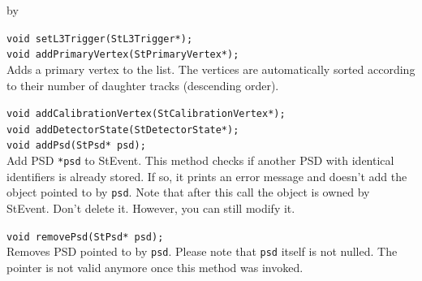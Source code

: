 \documentclass[twoside]{article}
\newcommand{\entrylabel}[1]{\mbox{\textbf{{#1}}}\hfil}%
\newenvironment{entry}
{\begin{list}{}%
    {\renewcommand{\makelabel}{\entrylabel}%
     \setlength{\labelwidth}{90pt}%
     \setlength{\leftmargin}{\labelwidth}
     \advance\leftmargin by \labelsep%
      }%
    }%
  {\end{list}}
\newcommand{\Entrylabel}[1]%
{\raisebox{0pt}[1ex][0pt]{\makebox[\labelwidth][l]%
    {\parbox[t]{\labelwidth}{\hspace{0pt}\textbf{{#1}}}}}}
\newenvironment{Entry}%
{\renewcommand{\entrylabel}{\Entrylabel}\begin{entry}}%
  {\end{entry}}
\begin{document}
\begin{Entry}
    \verb+void setL3Trigger(StL3Trigger*);+\\
    
    \verb+void addPrimaryVertex(StPrimaryVertex*);+\\
    Adds a primary vertex to the list. The vertices are
    automatically sorted according to their number of daughter
    tracks (descending order). 

    \verb+void addCalibrationVertex(StCalibrationVertex*);+\\

    \verb+void addDetectorState(StDetectorState*);+\\
    
    \verb+void addPsd(StPsd* psd);+\\
    Add PSD \texttt{*psd} to StEvent. This method checks if another
    PSD with identical identifiers is already stored. If so, it prints
    an error message and doesn't add the object pointed to by
    \texttt{psd}. Note that after this call the object is owned by StEvent.
    Don't delete it. However, you can still modify it.
    
    \verb+void removePsd(StPsd* psd);+\\
    Removes PSD pointed to by \texttt{psd}. Please note that \texttt{psd}
    itself is not nulled. The pointer is not valid anymore once this method
    was invoked.
    
\end{Entry}
\clearpage
\end{document}
